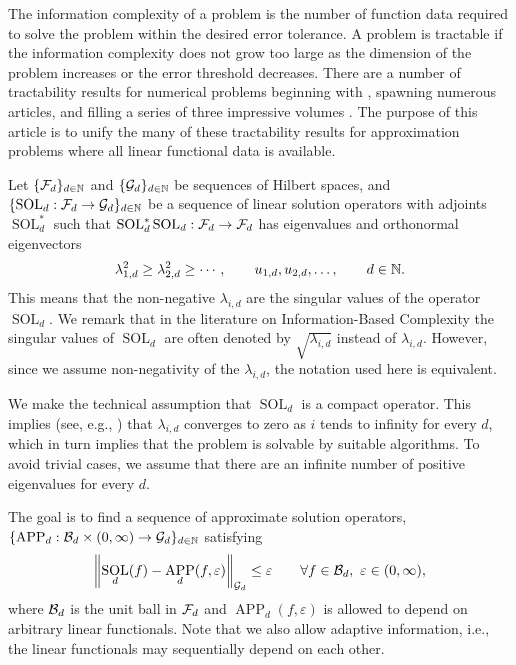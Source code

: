 \documentclass[sort&compress]{elsarticle}
\DeclareMathOperator{\SOL}{SOL}
\DeclareMathOperator{\APP}{APP}
\newcommand{\peter}[1]{\begingroup\color{violet}#1\endgroup}
\begin{document}
\bigskip

The information complexity of a problem is the number of function data required to solve the problem within the desired error tolerance.  A problem is tractable if the information complexity does not grow too large as the dimension of the problem increases or the error threshold decreases.  There are a number of tractability results for numerical problems beginning with \cite{W94a,W94b}, spawning numerous articles, and filling a series of three impressive volumes \cite{NovWoz08a,NovWoz10a,NovWoz12a}.  The purpose of this article is to unify the many of these tractability results for approximation problems where all linear functional data is available.

Let $\{\mathcal{F}_d\}_{d \in \mathbb{N}}$ and $\{\mathcal{G}_d\}_{d \in \mathbb{N}}$ be sequences of Hilbert spaces, and $\{\SOL_d : \cf_d \to \cg_d\}_{d \in \naturals}$ be a sequence of linear solution operators  with adjoints $\SOL_d^*$ such that $\SOL_d^*\SOL_d : \cf_d \to \cf_d$ has eigenvalues and orthonormal eigenvectors
\begin{equation} \label{eq:eigenvalues}
 \lambda_{1,d}^2 \ge \lambda_{2,d}^2 \ge \cdots, \qquad u_{1,d}, u_{2,d}, \ldots, \qquad d \in \mathbb{N}.
\end{equation}
This means that the non-negative $\lambda_{i,d}$ are the singular values of the operator $\SOL_d$. We remark that in the literature on Information-Based Complexity the singular values of $\SOL_d$ are often denoted by $\sqrt{\lambda_{i,d}}$ instead of $\lambda_{i,d}$. However, since we assume non-negativity of the $\lambda_{i,d}$, the notation used here is equivalent. 


We make the technical assumption that $\SOL_d$ is a compact operator. This implies (see, e.g., \cite{NovWoz08a}) that $\lambda_{i,d}$ converges to zero as $i$ tends to infinity for every $d$, which in turn implies that the problem is solvable by suitable algorithms. To avoid trivial cases, we assume that there are an infinite number of positive eigenvalues for every $d$.

The goal is to find a sequence of approximate solution operators, $\{\APP_d:\cb_d \times (0,\infty) \to \cg_d\}_{d \in \naturals}$ satisfying
\begin{equation}
    \label{eq:errcrit}
    \norm[\cg_d]{\SOL_d(f) - \APP_d(f,\varepsilon)} \le \varepsilon \qquad \forall f \in \cb_d, \ \varepsilon \in (0,\infty),
\end{equation}
where $\mathcal{B}_d$ is the unit ball in $\mathcal{F}_d$ and $\APP_d(f,\varepsilon)$ is allowed to depend on arbitrary linear functionals.  Note that we also allow adaptive information, i.e., the linear functionals may sequentially depend on each other.
\end{document}
